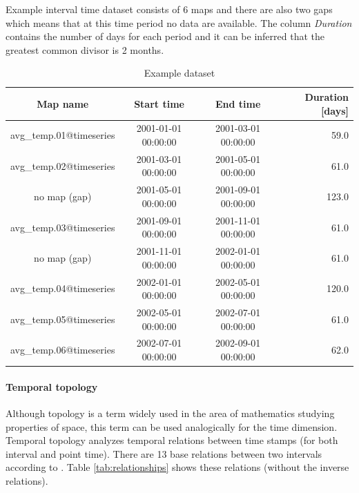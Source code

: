 \documentclass[a4paper,12pt]{book}
\begin{document}
Example interval time dataset consists of 6 maps and
there are also two gaps which means that at this time period no data are available.
The column \emph{Duration} contains the number of days for each period and it can be inferred
that the greatest common divisor is 2 months.
\begin{table}[ht!]
  \centering
  \caption{Example dataset}
  \label{tab:granularity}
\setlength{\extrarowheight}{3pt}
\begin{tabular}{cccr}
\toprule
 Map name & Start time & End time & Duration [days]\\\midrule
avg\_temp.01@timeseries &    2001-01-01 00:00:00  &   2001-03-01 00:00:00  &   59.0\\
avg\_temp.02@timeseries  &  2001-03-01 00:00:00  &   2001-05-01 00:00:00   &  61.0\\
no map (gap)    &  2001-05-01 00:00:00    & 2001-09-01 00:00:00   &  123.0\\
avg\_temp.03@timeseries     & 2001-09-01 00:00:00   &  2001-11-01 00:00:00  &   61.0\\
no map (gap) &   2001-11-01 00:00:00   &  2002-01-01 00:00:00  &   61.0 \\
avg\_temp.04@timeseries  &    2002-01-01 00:00:00   &  2002-05-01 00:00:00     & 120.0 \\
avg\_temp.05@timeseries  &      2002-05-01 00:00:00 &    2002-07-01 00:00:00 &    61.0 \\
avg\_temp.06@timeseries &     2002-07-01 00:00:00  &   2002-09-01 00:00:00   &  62.0\\
\bottomrule
\end{tabular}
\end{table}


\paragraph{Temporal topology}
\label{sec:temporalTopology}
Although topology is a term widely used in the area of mathematics studying properties of space,
this term can be used analogically for the time dimension.
Temporal topology analyzes temporal relations between time stamps (for both interval and point time).
There are 13 base relations between two intervals according to \cite{relationships}.
Table \ref{tab:relationships} shows these relations (without the inverse relations).
\end{document}
